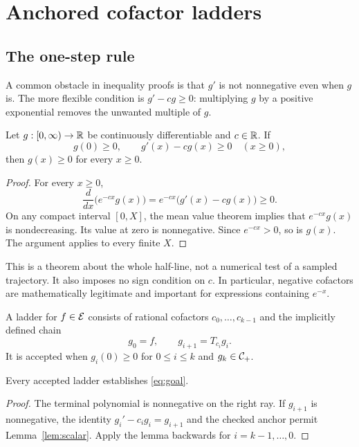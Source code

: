 \section{Anchored cofactor ladders}
\label{sec:ladders}

\subsection{The one-step rule}

A common obstacle in inequality proofs is that $g'$ is not nonnegative even when $g$ is. The more flexible condition is $g'-cg\ge0$: multiplying $g$ by a positive exponential removes the unwanted multiple of $g$.

\begin{lemma}
\label{lem:scalar}
Let $g:[0,\infty)\to\mathbb R$ be continuously differentiable and $c\in\mathbb R$. If
\[
 g(0)\ge0,\qquad g'(x)-cg(x)\ge0\quad(x\ge0),
\]
then $g(x)\ge0$ for every $x\ge0$.
\end{lemma}
\begin{proof}
For every $x\ge0$,
\[
 \frac{d}{dx}\bigl(e^{-cx}g(x)\bigr)
   =e^{-cx}\bigl(g'(x)-cg(x)\bigr)\ge0.
\]
On any compact interval $[0,X]$, the mean value theorem implies that $e^{-cx}g(x)$ is nondecreasing. Its value at zero is nonnegative. Since $e^{-cx}>0$, so is $g(x)$. The argument applies to every finite $X$.
\end{proof}

This is a theorem about the whole half-line, not a numerical test of a sampled trajectory. It also imposes no sign condition on $c$. In particular, negative cofactors are mathematically legitimate and important for expressions containing $e^{-x}$.

\begin{definition}
A ladder for $f\in\mathcal E$ consists of rational cofactors $c_0,\ldots,c_{k-1}$ and the implicitly defined chain
\[
 g_0=f,\qquad g_{i+1}=T_{c_i}g_i.
\]
It is accepted when $g_i(0)\ge0$ for $0\le i\le k$ and $g_k\in\mathcal C_+$.
\end{definition}

\begin{theorem}
\label{thm:ladder}
Every accepted ladder establishes \eqref{eq:goal}.
\end{theorem}
\begin{proof}
The terminal polynomial is nonnegative on the right ray. If $g_{i+1}$ is nonnegative, the identity $g_i'-c_i g_i=g_{i+1}$ and the checked anchor permit Lemma~\ref{lem:scalar}. Apply the lemma backwards for $i=k-1,\ldots,0$.
\end{proof}

